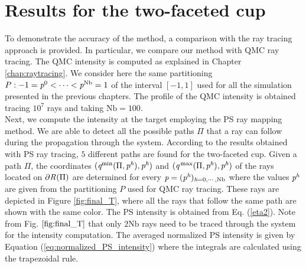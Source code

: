 \section{Results for the two-faceted cup}
To demonstrate the accuracy of the method, a comparison with the ray tracing approach is provided.
In particular, we compare our method with QMC ray tracing.
The QMC intensity is computed as explained in Chapter \ref{chap:raytracing}. 
We consider here the same partitioning $P:-1 = \textit{p}^0 < \cdots< \textit{p}^\textrm{Nb} = 1$ of the interval $[-1,1]$ used for all the simulation presented in the previous chapters. 
The profile of the QMC intensity is obtained tracing $10^7$ rays and taking $\textrm{Nb} = 100$.%
\\ \indent Next, we compute the intensity at the target employing the PS ray mapping method. We are able to detect all the possible paths $\Pi$ that a ray can follow during the propagation through the system. According to the results obtained with PS ray tracing, $5$ different paths are found for the two-faceted cup. Given a path $\Pi$, the coordinates $(\textit{q}^\textrm{min}(\Pi, \textit{p}^ {\textit{h}}), \textit{p}^ {\textit{h}})$ and $(\textit{q}^\textrm{\,max}(\Pi, \textit{p}^ {\textit{h}}), \textit{p}^{\textit{h}})$ of the rays located on $\partial \mbox{$\emph{R}_{\textit{}}$}(\Pi)$ are determined for every $\textit{p} = (\textit{p}^{\textit{h}})_{\textit{h}=0, \cdots, \textrm{Nb}}$ where the values $\textit{p}^{\textit{h}}$ are given from the partitioning $P$ used for QMC ray tracing. These rays are depicted in Figure \ref{fig:final_T}, where all the rays that follow the same path are shown with the same color. The PS intensity is obtained from Eq. (\ref{eta2}). Note from Fig. $\ref{fig:final_T}$ that only $2\textrm{Nb}$ rays need to be traced through the system for the intensity computation.
The averaged normalized PS intensity is given by Equation (\ref{eq:normalized_PS_intensity})
 where the integrals are calculated using the trapezoidal rule.
